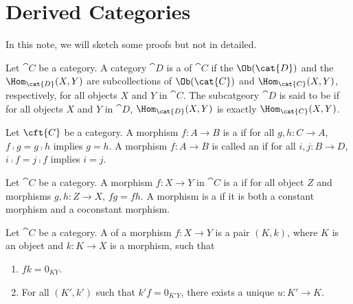 \pagebreak
\section{Derived Categories}
\par
In this note, we will sketch some proofs but not in detailed.
\begin{definition}
    Let $\cat{C}$ be a category. A category $\cat{D}$ is a  of $\cat{C}$ if the $\Ob(\cat{D})$ and the ${\Hom}_{\cat{D}}(X,Y)$ are subcollections of $\Ob(\cat{C})$ and ${\Hom}_{\cat{C}}(X,Y)$, respectively, for all objects $X$ and $Y$ in $\cat{C}$. The subcatgeory $\cat{D}$ is said to be  if for all objects $X$ and $Y$ in $\cat{D}$, ${\Hom}_{\cat{D}}(X,Y)$ is exactly ${\Hom}_{\cat{C}}(X,Y)$.
\end{definition}
\begin{definition}
    Let $\cft{C}$ be a category. A morphism $f:A\to B$ is a  if for all $g,h:C\to A$, $f\comp g=g\comp h$ implies $g=h$. A morphism $f:A\to B$ is called an  if for all $i,j:B\to D$, $i\comp f=j\comp f$ implies $i=j$.
\end{definition}
\begin{definition}
    Let $\cat{C}$ be a category. A morphism $f:X\to Y$ in $\cat{C}$ is a  if for all object $Z$ and morphisms $g,h:Z\to X$, $fg=fh$. A morphism is a  if it is both a constant morphism and a coconstant morphism.
\end{definition}
\begin{definition}
    Let $\cat{C}$ be a category. A  of a morphism $f:X\to Y$ is a pair $(K,k)$, where $K$ is an object and $k:K\to X$ is a morphism, such that 
    \begin{enumerate}
        \item $fk={0}_{KY}$.
        \item For all $(K',k')$ such that $k'f={0}_{K'Y}$, there exists a unique $u:K'\to K$.
    \end{enumerate}
    \begin{center}
    \end{center}
\end{definition}
